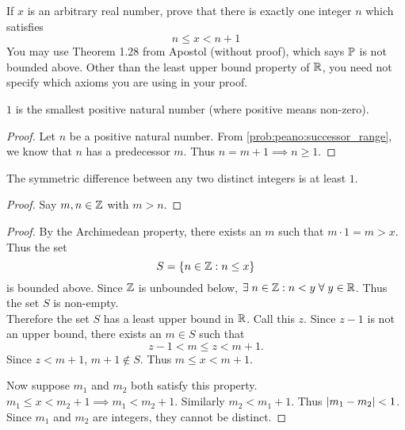 \documentclass[12pt]{article}
\begin{document}
\begin{problem}
    If $x$ is an arbitrary real number, prove that there is exactly one integer $n$ which satisfies \[
        n \leq x < n + 1
    \] You may use Theorem 1.28 from Apostol (without proof), which says $\P$ is not bounded above.
    Other than the least upper bound property of $\R$, you need not specify which axioms you are using in your proof.
\end{problem}
\begin{lem} \label{thm:N:no_natural_between_0_and_1}
    $1$ is the smallest positive natural number (where positive means non-zero).
\end{lem}
\begin{proof}
    Let $n$ be a positive natural number.
    From \cref{prob:peano:successor_range}, we know that $n$ has a predecessor $m$.
    Thus $n = m + 1 \implies n \geq 1$.
\end{proof}

\begin{lem} \label{thm:N:difference_geq_1}
    The symmetric difference between any two distinct integers is at least $1$.
\end{lem}
\begin{proof}
    Say $m, n \in \Z$ with $m > n$.
\end{proof}
\begin{proof}
    By the Archimedean property, there exists an $m$ such that $m \cdot 1 = m > x$. Thus the set \[
        S = \set{n \in \Z : n \leq x}
    \] is bounded above.
    Since $\Z$ is unbounded below, $\exists\; n \in \Z : n < y \;\forall\; y \in \R$. Thus the set $S$ is non-empty. \\
    Therefore the set $S$ has a least upper bound in $\R$.
    Call this $z$.
    Since $z-1$ is not an upper bound, there exists an $m \in S$ such that \[
        z - 1 < m \leq z < m + 1.
    \] Since $z < m + 1$, $m + 1 \notin S$.
    Thus $m \leq x < m + 1$.

    Now suppose $m_{1}$ and $m_{2}$ both satisfy this property.
    $m_{1} \leq x < m_{2} + 1 \implies m_{1} < m_{2} + 1$.
    Similarly $m_{2} < m_{1} + 1$.
    Thus $\abs{m_{1} - m_{2}} < 1$.
    Since $m_{1}$ and $m_{2}$ are integers, they cannot be distinct.
\end{proof}
\end{document}

